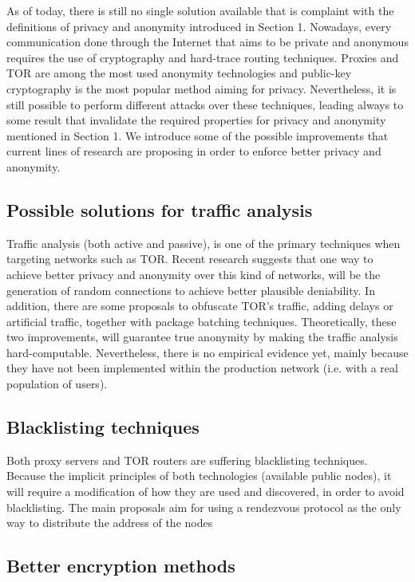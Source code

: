 \documentclass[conference]{IEEEtran}
\begin{document}
As of today, there is still no single solution available that is complaint with the definitions of privacy and anonymity introduced in Section 1. Nowadays, every communication done through the Internet that aims to be private and anonymous requires the use of cryptography and hard-trace routing techniques.  Proxies and TOR are among the most used anonymity technologies\cite{averview} and public-key cryptography is the most popular method aiming for privacy. Nevertheless, it is still possible to perform different attacks over these techniques, leading always to some result that invalidate the required properties for privacy and anonymity mentioned in Section 1. We introduce some of the possible improvements that current lines of research are proposing in order to enforce better privacy and anonymity.

\subsection{Possible solutions for traffic analysis}

Traffic analysis (both active and passive), is one of the primary techniques when targeting networks such as TOR. Recent research suggests that one way to achieve better privacy and anonymity over this kind of networks, will be the generation of random connections to achieve better plausible deniability\cite{SWARM}. In addition, there are some proposals to obfuscate TOR's traffic, adding delays or artificial traffic, together with package batching techniques\cite{AQUA}. Theoretically, these two improvements, will guarantee true anonymity by making the traffic analysis hard-computable. Nevertheless, there is no empirical evidence yet, mainly because they have not been implemented within the production network (i.e. with a real population of users).

\subsection{Blacklisting techniques}

Both proxy servers and TOR routers are suffering blacklisting techniques. Because the implicit principles of both technologies (available public nodes), it will require a modification of how they are used and discovered, in order to avoid blacklisting. The main proposals aim for using a rendezvous protocol as the only way to distribute the address of the nodes\cite{boost}

\subsection{Better encryption methods}
\end{document}
